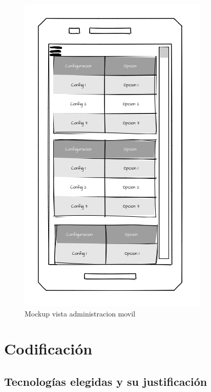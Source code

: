 \documentclass[11pt,spanish,listoffigures,listoftables]{tfgetsinf}
\begin{document}
 \begin{figure}[h!] %
   \includegraphics[width=\linewidth]{img/Vista_Administracion_MVL.png}
   \caption{Mockup vista administracion movil}
   \label{fig:administracionMVL}
 \end{figure}

\chapter{Codificación}

\section{Tecnologías elegidas y su justificación}
\end{document}
